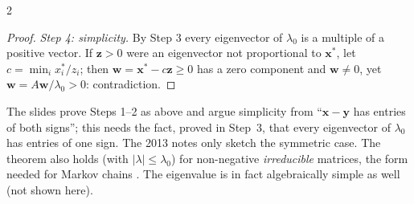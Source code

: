 \begin{paracol}{2}
\begin{proof}
\emph{Step 4: simplicity.} By Step 3 every eigenvector of $\lambda_0$ is a multiple of a positive vector. If
$\bm z>0$ were an eigenvector not proportional to $\bm x^*$, let $c=\min_ix^*_i/z_i$; then $\bm w=\bm x^*-c\bm z\ge0$ has a zero
component and $\bm w\ne0$, yet $\bm w=A\bm w/\lambda_0>0$: contradiction.
\end{proof}

\begin{coursenote}
The slides prove Steps 1--2 as above and argue simplicity from ``$\bm x-\bm y$ has entries of both
signs''; this needs the fact, proved in Step~3, that every eigenvector of $\lambda_0$ has entries of one
sign. The 2013 notes only sketch the symmetric case. The theorem also holds (with
$|\lambda|\le\lambda_0$) for non-negative \emph{irreducible} matrices, the form needed for Markov chains
. The eigenvalue is in fact algebraically simple as well (not shown here).
\end{coursenote}


\end{paracol}
